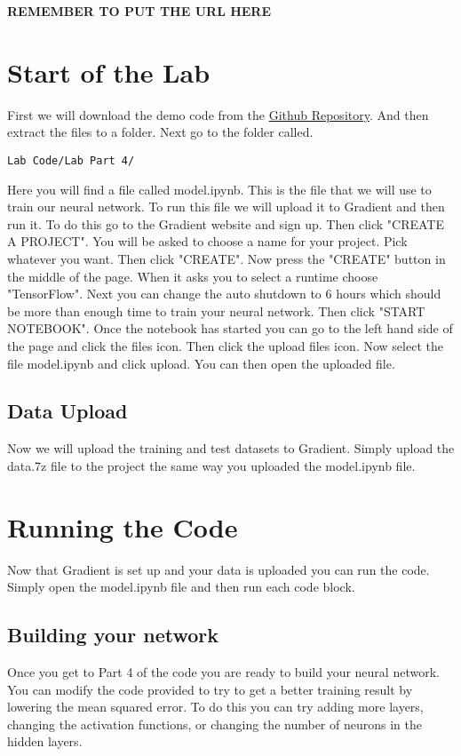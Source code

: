 \documentclass[11pt]{report}
\begin{document}
\textbf{REMEMBER TO PUT THE URL HERE}

\pagebreak

\chapter{Start of the Lab}
First we will download the demo code from the \href{https://github.com/PiCarV/Demos/archive/refs/heads/main.zip}{Github Repository}. And then extract the files to a folder. Next go to the folder called.
\begin{verbatim} 
Lab Code/Lab Part 4/
\end{verbatim}

Here you will find a file called model.ipynb. This is the file that we will use to train our neural network. To run this file we will upload it to Gradient and then run it.
To do this go to the Gradient website and sign up. Then click "CREATE A PROJECT". You will be asked to choose a name for your project. Pick whatever you want. Then click "CREATE". Now press the "CREATE" button in the middle of the page. When it asks you to select a runtime choose "TensorFlow". Next you can change the auto shutdown to 6 hours which should be more than enough time to train your neural network. Then click "START NOTEBOOK". Once the notebook has started you can go to the left hand side of the page and click the files icon. Then click the upload files icon. Now select the file model.ipynb and click upload. You can then open the uploaded file.

\section{Data Upload}
Now we will upload the training and test datasets to Gradient. Simply upload the data.7z file to the project the same way you uploaded the model.ipynb file.

\chapter{Running the Code}
Now that Gradient is set up and your data is uploaded you can run the code. Simply open the model.ipynb file and then run each code block.

\section{Building your network}
Once you get to Part 4 of the code you are ready to build your neural network. You can modify the code provided to try to get a better training result by lowering the mean squared error. To do this you can try adding more layers, changing the activation functions, or changing the number of neurons in the hidden layers.
\end{document}

